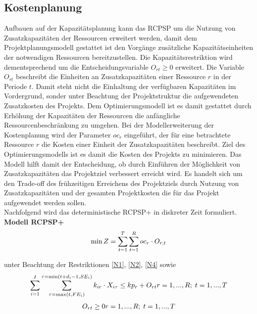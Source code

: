 \documentclass[a4paper,12pt,parskip,bibtotoc,liststotoc]{article}
\begin{document}
\subsection{Kostenplanung}
Aufbauen auf der Kapazitätsplanung kann das RCPSP um die Nutzung von Zusatzkapazitäten der Ressourcen erweitert werden, damit dem Projektplanungsmodell gestattet ist den Vorgänge zusätzliche Kapazitätseinheiten der notwendigen Ressourcen bereitzustellen. Die Kapazitätsrestriktion wird dementsprechend um die Entscheidungsvariable $O_{rt} \geq 0$ erweitert. Die Variable $O_{rt}$ beschreibt die Einheiten an Zusatzkapazitäten einer Ressource $r$ in der Periode $t$. Damit steht nicht die Einhaltung der verfügbaren Kapazitäten im Vordergrund, sonder unter Beachtung der Projektstruktur die aufgewendeten Zusatzkosten des Projekts. Dem Optimierungsmodell ist es damit gestattet durch Erhöhung der Kapazitäten der Ressourcen die anfängliche Ressourcenbeschränkung zu umgehen. Bei der Modellerweiterung der Kostenplanung wird der Parameter $oc_r$ eingeführt, der für eine betrachtete Ressource $r$ die Kosten einer Einheit der Zusatzkapazitäten beschreibt. Ziel des Optimierungsmodells ist es damit die Kosten des Projekts zu minimieren. Das Modell hilft damit der Entscheidung, ob durch Einführen der Möglichkeit von Zusatzkapazitäten das Projektziel verbessert erreicht wird. Es handelt sich um den Trade-off des frühzeitigen Erreichens des Projektziels durch Nutzung von Zusatzkapazitäten und der gesamten Projektkosten die für das Projekt aufgewendet werden sollen.\\

Nachfolgend wird das deterministische RCPSP+ in diskreter Zeit formuliert.\\

\textbf{Modell RCPSP+}
\begin{eqnarray} \label{Ziel2}
\min Z = \sum_{t=1}^{T}\sum_{t=1}^{R} oc_{r} \cdot O_{r,t}\hfill  
\end{eqnarray}

unter Beachtung der Restriktionen \eqref{N1}, \eqref{N2}, \eqref{N4} sowie
\begin{multline} \label{N5}
\sum_{i=1}^{I}\sum_{\tau=\max(t,FE_{i})}^{\tau=\min(t+d_i-1,SE_i)}k_ {ir} \cdot X_{i\tau} \leq kp_{r} + O_{rt}
\hfill   r =1,...,R;\; t=1,...,T
\end{multline}\vspace{-3.0ex}
\begin{multline} \label{N6}
O_{rt} \geq 0
\hfill   r =1,...,R;\; t=1,...,T \end{multline}\vspace{-6.0ex}\\
\end{document}
